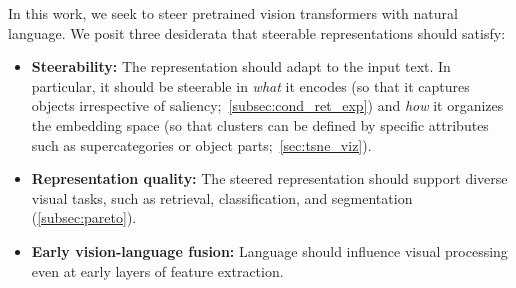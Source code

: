 In this work, we seek to steer %
pretrained vision transformers with natural language.
We posit three desiderata that steerable representations should satisfy:
\begin{itemize}[nosep]
\item \textbf{Steerability:} 
The representation should adapt to the input text. In particular, it should be steerable 
in \textit{what} it encodes
(so that it captures objects irrespective of saliency;~\cref{subsec:cond_ret_exp})
and \textit{how} it organizes the embedding space
(so that clusters can be defined by specific attributes such as supercategories or object parts;~\cref{sec:tsne_viz}).


\item \textbf{Representation quality:} The steered representation should support diverse 
visual tasks, such as retrieval, classification, and segmentation (\cref{subsec:pareto}).
\item \textbf{Early vision-language fusion:} 
Language should influence visual processing even at early layers of feature extraction.
\end{itemize}

